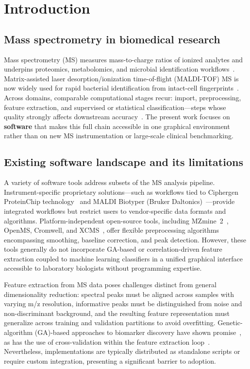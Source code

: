\documentclass[preprint,12pt]{elsarticle}
\begin{document}
\section{Introduction}

\subsection{Mass spectrometry in biomedical research}
Mass spectrometry (MS) measures mass-to-charge ratios of ionized analytes and underpins proteomics, metabolomics, and microbial identification workflows~\cite{Arnold2006}. Matrix-assisted laser desorption/ionization time-of-flight (MALDI-TOF) MS is now widely used for rapid bacterial identification from intact-cell fingerprints~\cite{Krishnamurthy1996,Croxatto2012}. Across domains, comparable computational stages recur: import, preprocessing, feature extraction, and supervised or statistical classification---steps whose quality strongly affects downstream accuracy~\cite{Wagner2003,Yang2009}. The present work focuses on \textbf{software} that makes this full chain accessible in one graphical environment rather than on new MS instrumentation or large-scale clinical benchmarking.

\subsection{Existing software landscape and its limitations}
A variety of software tools address subsets of the MS analysis pipeline. Instrument-specific proprietary solutions---such as workflows tied to Ciphergen ProteinChip technology~\cite{Conrads2004} and MALDI Biotyper (Bruker Daltonics)~\cite{Buchan2012}---provide integrated workflows but restrict users to vendor-specific data formats and algorithms. Platform-independent open-source tools, including MZmine~2~\cite{Pluskal2010}, OpenMS, Cromwell, and XCMS~\cite{Yang2009}, offer flexible preprocessing algorithms encompassing smoothing, baseline correction, and peak detection. However, these tools generally do not incorporate GA-based or correlation-driven feature extraction coupled to machine learning classifiers in a unified graphical interface accessible to laboratory biologists without programming expertise.

Feature extraction from MS data poses challenges distinct from general dimensionality reduction: spectral peaks must be aligned across samples with varying m/z resolution, informative peaks must be distinguished from noise and non-discriminant background, and the resulting feature representation must generalize across training and validation partitions to avoid overfitting. Genetic-algorithm (GA)-based approaches to biomarker discovery have shown promise~\cite{Armananzas2011,Liu2013}, as has the use of cross-validation within the feature extraction loop~\cite{Liu2013}. Nevertheless, implementations are typically distributed as standalone scripts or require custom integration, presenting a significant barrier to adoption.
\end{document}
